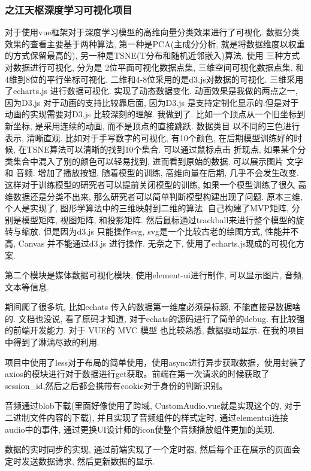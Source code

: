 \documentclass[UTF8]{ctexart}
\begin{document}
\subsubsection{之江天枢深度学习可视化项目}
对于使用vue框架对于深度学习模型的高维向量分类效果进行了可视化. 数据分类效果的查看主要基于两种算法, 第一种是PCA(主成分分析, 就是将数据维度以权重的方式保留最高的), 另一种是TSNE(T分布和随机近邻嵌入)算法,  使用 三种方式对数据进行可视化, 分为是 2位平面可视化数据点集, 三维空间可视化数据点集, 和 4维到8位的平行坐标可视化. 二维和4-8位采用的是d3.js对数据的可视化. 三维采用了echarts.js 进行数据可视化. 实现了动态数据变化. 动画效果是我做的两点之一, 因为D3.js 对于动画的支持比较靠后面, 因为D3.js 是支持定制化显示的.但是对于动画的实现需要对D3.js 比较深刻的理解. 我做到了. 比如一个顶点从一个旧坐标到新坐标, 是采用连续的动画, 而不是顶点的直接跳跃. 数据类目 以不同的三色进行表示, 清晰直观. 比如对于手写数字的可视化, 有10个颜色, 在后期模型训练好的时候, 在TSNE算法可以清晰的找到10个集合. 可以通过鼠标点击 折现点, 如果某个分类集合中混入了别的颜色可以轻易找到, 进而看到原始的数据. 可以展示图片 文字 和 音频.  增加了播放按钮, 随着模型的训练, 高维向量在后期, 几乎不会发生改变. 这样对于训练模型的研究者可以提前关闭模型的训练, 如果一个模型训练了很久 高维数据还是分类不出来, 那么研究者可以简单判断模型构建出现了问题.
原本三维,个人是实现了, 图形学算法中的三维映射到二维的算法. 自己构建了MVP矩阵, 分别是模型矩阵, 视图矩阵, 和投影矩阵. 然后鼠标通过trackball来进行整个模型的旋转与缩放. 但是因为d3.js 只能操作svg, svg是一个比较古老的绘图方式, 性能并不高, Canvas 并不能通过d3.js 进行操作. 无奈之下, 使用了echarts.js现成的可视化方案.

第二个模块是媒体数据可视化模块, 使用element-ui进行制作, 可以显示图片, 音频, 文本等信息.

期间爬了很多坑, 比如echats 传入的数据第一维度必须是标题, 不能直接是数据啥的. 文档也没说, 看了原码才知道, 对于echats的源码进行了简单的debug. 有比较强的前端开发能力. 对于 VUE的  MVC 模型 也比较熟悉, 数据驱动显示. 在我的项目中得到了淋漓尽致的利用.

项目中使用了less对于布局的简单使用，使用async进行异步获取数据，使用封装了axios的模块进行对于数据进行get获取。前端在第一次请求的时候获取了session\_id,然后之后都会携带有cookie对于身份的判断识别。

音频通过blob下载(里面好像使用了跨域, CustomAudio.vue就是实现这个的, 对于二进制文件内容的下载), 并且实现了音频组件的样式定时, 通过elementui连接audio中的事件,  通过更换UI设计师的icon使整个音频播放组件更加的美观.

数据的实时同步的实现, 通过前端实现了一个定时器, 然后每个正在展示的页面会定时发送数据请求, 然后更新数据的显示.
\end{document}
